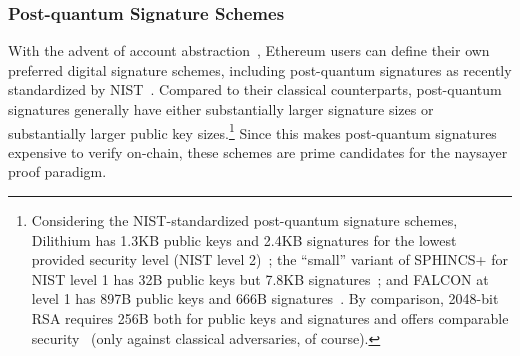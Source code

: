 \subsubsection{Post-quantum Signature Schemes}\label{sec:pqsig_naysayer}

With the advent of account abstraction~\cite{accountabstraction}, Ethereum users can define their own preferred digital signature schemes, including post-quantum signatures as recently standardized by NIST~\cite{CCS:BHKNRS19,TCHES:DKLLS18,NISTPQC:FALCON22}.
Compared to their classical counterparts, post-quantum signatures generally have either substantially larger signature sizes or substantially larger public key sizes.\footnote{Considering the NIST-standardized post-quantum signature schemes, Dilithium has 1.3KB public keys and 2.4KB signatures for the lowest provided security level (NIST level 2)~\cite{dilithium-spec}; the ``small'' variant of SPHINCS+ for NIST level 1 has 32B public keys but 7.8KB signatures~\cite{sphincsplus-spec}; and FALCON at level 1 has 897B public keys and 666B signatures~\cite{falcon-spec}. By comparison, 2048-bit RSA requires 256B both for public keys and signatures and offers comparable security~\cite{keylength} (only against classical adversaries, of course).}
Since this makes post-quantum signatures expensive to verify on-chain, these schemes are prime candidates for the naysayer proof paradigm.


